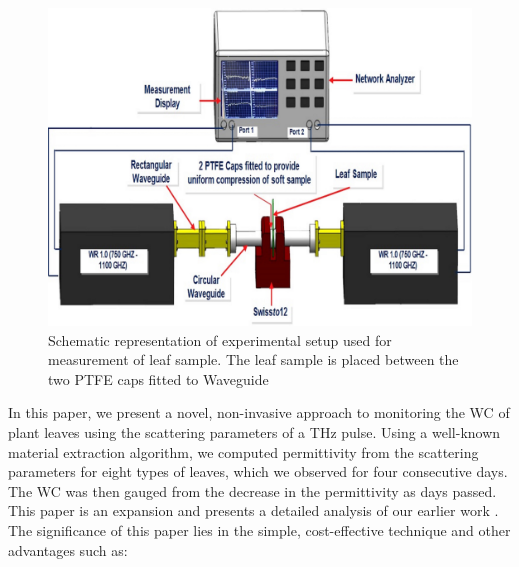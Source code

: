 \documentclass[journal,article,submit,moreauthors,pdftex]{Definitions/mdpi}
\renewcommand{\^}{\hat}  %
\begin{document}
\begin{figure}[t!]
	\centering
	\includegraphics[trim={0cm 0cm 0cm 0cm}, clip,width=.65\linewidth]{setup8c.jpg}
	\caption{Schematic representation of experimental setup used for measurement of leaf sample. The leaf sample is placed between the two PTFE caps fitted to Waveguide}\label{fig:setup8c}
\end{figure}
In this paper, we present a novel, non-invasive approach to monitoring the WC of plant leaves using the scattering parameters of a THz pulse. Using a well-known material extraction algorithm, we computed permittivity from the scattering parameters for eight types of leaves, which we observed for four consecutive days. The WC was then gauged from the decrease in the permittivity as days passed. This paper is an expansion and presents a detailed analysis of our earlier work \cite{Zahid2018}. The significance of this paper lies in the simple, cost-effective technique and other advantages such as:
\end{document}

